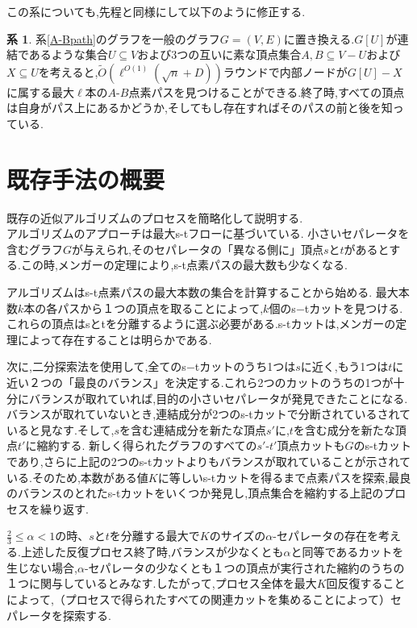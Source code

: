 \documentclass{thesis}
\theoremstyle{definition}
\newtheorem{corollary}{系}
\begin{document}
この系についても,先程と同様にして以下のように修正する.

\begin{corollary}
    系\ref{A-Bpath}のグラフを一般のグラフ$G =(V,E)$に置き換える.$G[U]$が連結であるような集合$U \subseteq V$および3つの互いに素な頂点集合$A,B \subseteq V - U$および$X \subseteq U$を考えると,$\tilde{O}(\ell^{O(1)}(\sqrt{n}+D))$ラウンドで内部ノードが$G[U] - X$に属する最大$\ell$本の$A$-$B$点素パスを見つけることができる.終了時,すべての頂点は自身がパス上にあるかどうか,そしてもし存在すればそのパスの前と後を知っている.
\end{corollary}


\chapter{既存手法の概要}

既存の近似アルゴリズム\cite{brandt2017approximating}のプロセスを簡略化して説明する.\\

アルゴリズムのアプローチは最大s-tフローに基づいている.
小さいセパレータを含むグラフ$G$が与えられ,そのセパレータの「異なる側に」頂点$s$と$t$があるとする.この時,メンガーの定理により,s-t点素パスの最大数も少なくなる.\par
アルゴリズムはs-t点素パスの最大本数の集合を計算することから始める.
最大本数$k$本の各パスから１つの頂点を取ることによって,$k$個のs−tカットを見つける.これらの頂点はsとtを分離するように選ぶ必要がある.s-tカットは,メンガーの定理によって存在することは明らかである.\par

次に,二分探索法を使用して,全てのs−tカットのうち1つは$s$に近く,もう1つは$t$に近い２つの「最良のバランス」を決定する.これら2つのカットのうちの1つが十分にバランスが取れていれば,目的の小さいセパレータが発見できたことになる.バランスが取れていないとき,連結成分が2つのs-tカットで分断されているされていると見なす.そして,$s$を含む連結成分を新たな頂点$s'$に,$t$を含む成分を新たな頂点$t'$に縮約する.
新しく得られたグラフのすべての$s'$-$t'$頂点カットも$G$のs-tカットであり,さらに上記の2つのs-tカットよりもバランスが取れていることが示されている.そのため,本数がある値$K$に等しいs-tカットを得るまで点素パスを探索,最良のバランスのとれたs-tカットをいくつか発見し,頂点集合を縮約する上記のプロセスを繰り返す.\par

$\frac{2}{3} \leq \alpha < 1$の時、$s$と$t$を分離する最大で$K$のサイズの$\alpha$-セパレータの存在を考える.上述した反復プロセス終了時,バランスが少なくとも$\alpha$と同等であるカットを生じない場合,$\alpha$-セパレータの少なくとも１つの頂点が実行された縮約のうちの１つに関与しているとみなす.したがって,プロセス全体を最大$K$回反復することによって,（プロセスで得られたすべての関連カットを集めることによって）セパレータを探索する.\par
\end{document}
